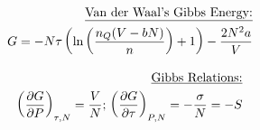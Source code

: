 \documentclass[12pt]{article}
\begin{document}
\noindent{}

\begin{multicols}{2}

  \begin{equation*}
    \begin{split}
      \text{\underline{Van der Waal's Gibbs Energy:}}\\
      G=-N\tau\left(\ln\left( \frac{n_Q(V-bN)}{n} \right)+1\right)-\frac{2N^2a}{V}
    \end{split}
  \end{equation*}

  \begin{equation*}
    \begin{split}
      \text{\underline{Gibbs Relations:}}\\
      \left( \frac{\partial G}{\partial P} \right)_{\tau,N}=\frac{V}{N};\,\left( \frac{\partial G}{\partial \tau} \right)_{P,N}=-\frac{\sigma}{N}=-S
    \end{split}
  \end{equation*}

\end{multicols}

\vspace{-35pt}
\end{document}

